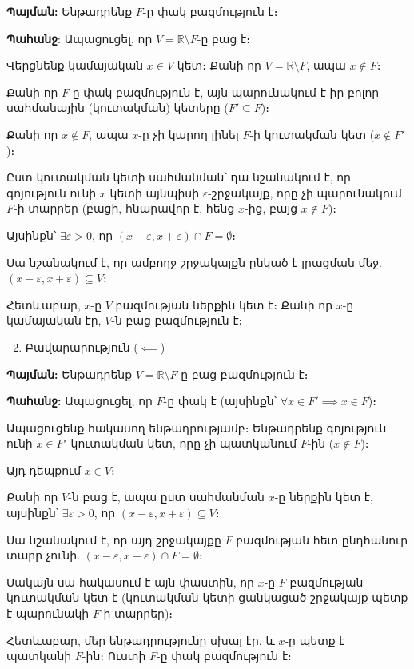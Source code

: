 \documentclass[12pt, a4paper]{article}
\begin{document}
\textbf{Պայման:} Ենթադրենք $F$-ը փակ բազմություն է։

\textbf{Պահանջ}: Ապացուցել, որ $V = \mathbb{R} \setminus F$-ը բաց է։

Վերցնենք կամայական $x \in V$ կետ։ Քանի որ $V = \mathbb{R} \setminus F$, ապա $x \notin F$։

Քանի որ $F$-ը փակ բազմություն է, այն պարունակում է իր բոլոր սահմանային (կուտակման) կետերը ($F' \subseteq F$)։

Քանի որ $x \notin F$, ապա $x$-ը չի կարող լինել $F$-ի կուտակման կետ ($x \notin F'$)։

Ըստ կուտակման կետի սահմանման՝ դա նշանակում է, որ գոյություն ունի $x$ կետի այնպիսի $\varepsilon$-շրջակայք, որը չի պարունակում $F$-ի տարրեր (բացի, հնարավոր է, հենց $x$-ից, բայց $x \notin F$)։

Այսինքն՝ $\exists \varepsilon > 0$, որ $(x - \varepsilon, x + \varepsilon) \cap F = \emptyset$։

Սա նշանակում է, որ ամբողջ շրջակայքն ընկած է լրացման մեջ. $(x - \varepsilon, x + \varepsilon) \subseteq V$։

Հետևաբար, $x$-ը $V$ բազմության ներքին կետ է։ Քանի որ $x$-ը կամայական էր, $V$-ն բաց բազմություն է։

\begin{enumerate}
    \setcounter{enumi}{1}
    \item Բավարարություն ($\impliedby$)
\end{enumerate}

\textbf{Պայման:} Ենթադրենք $V = \mathbb{R} \setminus F$-ը բաց բազմություն է։

\textbf{Պահանջ:} Ապացուցել, որ $F$-ը փակ է (այսինքն՝ $\forall x \in F' \implies x \in F$)։

Ապացուցենք հակասող ենթադրությամբ։ Ենթադրենք գոյություն ունի $x \in F'$ կուտակման կետ, որը չի պատկանում $F$-ին ($x \notin F$)։

Այդ դեպքում $x \in V$։

Քանի որ $V$-ն բաց է, ապա ըստ սահմանման $x$-ը ներքին կետ է, այսինքն՝ $\exists \varepsilon > 0$, որ $(x - \varepsilon, x + \varepsilon) \subseteq V$։

Սա նշանակում է, որ այդ շրջակայքը $F$ բազմության հետ ընդհանուր տարր չունի. $(x - \varepsilon, x + \varepsilon) \cap F = \emptyset$։

Սակայն սա հակասում է այն փաստին, որ $x$-ը $F$ բազմության կուտակման կետ է (կուտակման կետի ցանկացած շրջակայք պետք է պարունակի $F$-ի տարրեր)։

Հետևաբար, մեր ենթադրությունը սխալ էր, և $x$-ը պետք է պատկանի $F$-ին։ Ուստի $F$-ը փակ բազմություն է։
\end{document}
